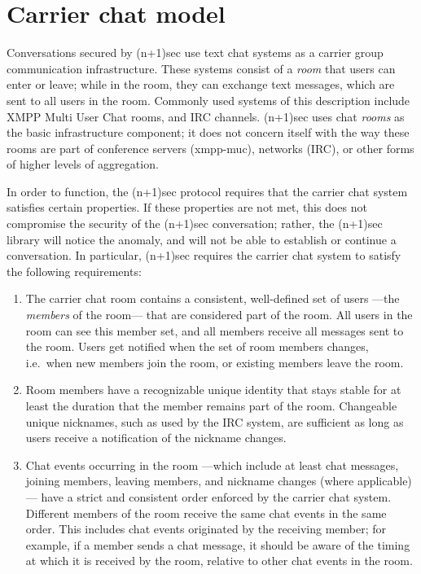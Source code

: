 \documentclass{article}
\begin{document}
\section{Carrier chat model}
\label{sec:carrier-chat-model}

Conversations secured by (n+1)sec use text chat systems as a carrier group communication infrastructure.
These systems consist of a \emph{room} that users can enter or leave; while in the room, they can exchange text messages, which are sent to all users in the room.
Commonly used systems of this description include XMPP Multi User Chat rooms, and IRC channels.
(n+1)sec uses chat \emph{rooms} as the basic infrastructure component; it does not concern itself with the way these rooms are part of conference servers (xmpp-muc), networks (IRC), or other forms of higher levels of aggregation.

In order to function, the (n+1)sec protocol requires that the carrier chat system satisfies certain properties.
If these properties are not met, this does not compromise the security of the (n+1)sec conversation; rather, the (n+1)sec library will notice the anomaly, and will not be able to establish or continue a conversation.
In particular, (n+1)sec requires the carrier chat system to satisfy the following requirements:
\begin{enumerate}
\item The carrier chat room contains a consistent, well-defined set of users ---the \emph{members} of the room--- that are considered part of the room. All users in the room can see this member set, and all members receive all messages sent to the room. Users get notified when the set of room members changes, i.e.\ when new members join the room, or existing members leave the room.
\item Room members have a recognizable unique identity that stays stable for at least the duration that the member remains part of the room. Changeable unique nicknames, such as used by the IRC system, are sufficient as long as users receive a notification of the nickname changes.
\item \label{enum:carrier-chat-model/chat-event-order} Chat events occurring in the room ---which include at least chat messages, joining members, leaving members, and nickname changes (where applicable)--- have a strict and consistent order enforced by the carrier chat system. Different members of the room receive the same chat events in the same order. This includes chat events originated by the receiving member; for example, if a member sends a chat message, it should be aware of the timing at which it is received by the room, relative to other chat events in the room.
\end{enumerate}
\end{document}
